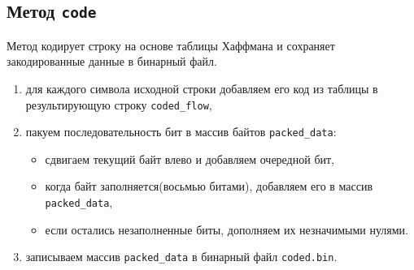 \subsection{Метод \texttt{code}}
Метод кодирует строку на основе таблицы Хаффмана и сохраняет закодированные данные в бинарный файл.
\begin{enumerate}
	\item для каждого символа исходной строки добавляем его код из таблицы в результирующую строку \texttt{coded\_flow},
	\item пакуем последовательность бит в массив байтов \texttt{packed\_data}:
	\begin{itemize}
		\item сдвигаем текущий байт влево и добавляем очередной бит,
		\item когда байт заполняется(восьмью битами), добавляем его в массив \texttt{packed\_data},
		\item если остались незаполненные биты, дополняем их незначимыми нулями.
	\end{itemize}
	\item записываем массив \texttt{packed\_data} в бинарный файл \texttt{coded.bin}.
\end{enumerate}


\clearpage
